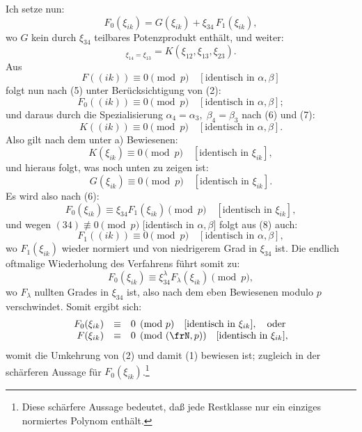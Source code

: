 \documentclass[11pt]{article}
\begin{document}
Ich setze nun:
\begin{equation}
        F_0(\xi_{ik})=G(\xi_{ik})+\xi_{34}\,F_1(\xi_{ik}),
\end{equation}
wo \(G\) kein durch \(\xi_{34}\) teilbares Potenzprodukt enthält, und weiter:
\begin{equation}
        [G]_{\xi_{14}=\xi_{13}}=K(\xi_{12},\xi_{13},\xi_{23}).
\end{equation}
Aus
\[
        F((ik))\equiv0\pmod p\quad[\text{identisch in \(\alpha,\beta\)}]
\]
folgt nun nach (5) unter Berücksichtigung von (2):
\begin{equation}
        F_0((ik))\equiv0\pmod p\quad [\text{identisch in \(\alpha,\beta\)}];
\end{equation}
und daraus durch die Spezialisierung \(\alpha_4=\alpha_3,\;\beta_4=\beta_3\) nach (6) und (7):
\[
        K((ik))\equiv0\pmod p\quad [\text{identisch in \(\alpha,\beta\)}].
\]
Also gilt nach dem unter a) Bewiesenen:
\[
        K(\xi_{ik})\equiv0\pmod p\quad [\text{identisch in \(\xi_{ik}\)}],
\]
und hieraus folgt, was noch unten zu zeigen ist:
\[
        G(\xi_{ik})\equiv0\pmod p\quad [\text{identisch in \(\xi_{ik}\)}].
\]
Es wird also nach (6):
\[
        F_0(\xi_{ik})\equiv\xi_{34}F_1(\xi_{ik})\pmod p\quad [\text{identisch in \(\xi_{ik}\)}],
\]
und wegen \((34)\not\equiv0\pmod p\) [identisch in \(\alpha,\beta\)] folgt aus (8) auch:
\[
        F_1((ik))\equiv0\pmod p\quad [\text{identisch in \(\alpha,\beta\)}],
\]
wo \(F_1(\xi_{ik})\) wieder normiert und von niedrigerem Grad in \(\xi_{34}\) ist. Die endlich oftmalige Wiederholung des Verfahrens führt somit zu:
\[
        F_0(\xi_{ik})\equiv\xi_{34}^{\lambda}F_\lambda(\xi_{ik})\pmod p,
\]
wo \(F_\lambda\) nullten Grades in \(\xi_{34}\) ist, also nach dem eben Bewiesenen modulo \(p\) verschwindet. Somit ergibt sich:
\begin{equation}
\begin{array}{rcl}
        F_0(\xi_{ik})&\equiv&0\pmod p\quad [\text{identisch in \(\xi_{ik}\)}],\quad\text{oder}\\
        F(\xi_{ik})&\equiv&0\pmod{(\frN,p)}\quad [\text{identisch in \(\xi_{ik}\)}],
\end{array}
\end{equation}
womit die Umkehrung von (2) und damit (1) bewiesen ist; zugleich in der schärferen Aussage für \(F_0(\xi_{ik})\).\footnote{Diese schärfere Aussage bedeutet, daß jede Restklasse nur ein einziges normiertes Polynom enthält.}
\end{document}
